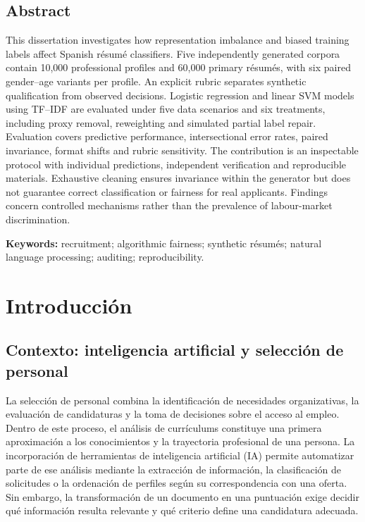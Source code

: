 \documentclass[11pt,a4paper,oneside]{report}
\begin{document}
\section*{Abstract}
This dissertation investigates how representation imbalance and biased training labels affect Spanish résumé classifiers. Five independently generated corpora contain 10,000 professional profiles and 60,000 primary résumés, with six paired gender--age variants per profile. An explicit rubric separates synthetic qualification from observed decisions. Logistic regression and linear SVM models using TF--IDF are evaluated under five data scenarios and six treatments, including proxy removal, reweighting and simulated partial label repair. Evaluation covers predictive performance, intersectional error rates, paired invariance, format shifts and rubric sensitivity. The contribution is an inspectable protocol with individual predictions, independent verification and reproducible materials. Exhaustive cleaning ensures invariance within the generator but does not guarantee correct classification or fairness for real applicants. Findings concern controlled mechanisms rather than the prevalence of labour-market discrimination.

\noindent\textbf{Keywords:} recruitment; algorithmic fairness; synthetic résumés; natural language processing; auditing; reproducibility.
\clearpage
\tableofcontents
\clearpage\listoffigures
\clearpage
{}

\chapter{Introducción}
\label{cap:introduccion}

\section{Contexto: inteligencia artificial y selección de personal}

La selección de personal combina la identificación de necesidades organizativas, la evaluación de candidaturas y la toma de decisiones sobre el acceso al empleo. Dentro de este proceso, el análisis de currículums constituye una primera aproximación a los conocimientos y la trayectoria profesional de una persona. La incorporación de herramientas de inteligencia artificial (IA) permite automatizar parte de ese análisis mediante la extracción de información, la clasificación de solicitudes o la ordenación de perfiles según su correspondencia con una oferta. Sin embargo, la transformación de un documento en una puntuación exige decidir qué información resulta relevante y qué criterio define una candidatura adecuada.
\end{document}
